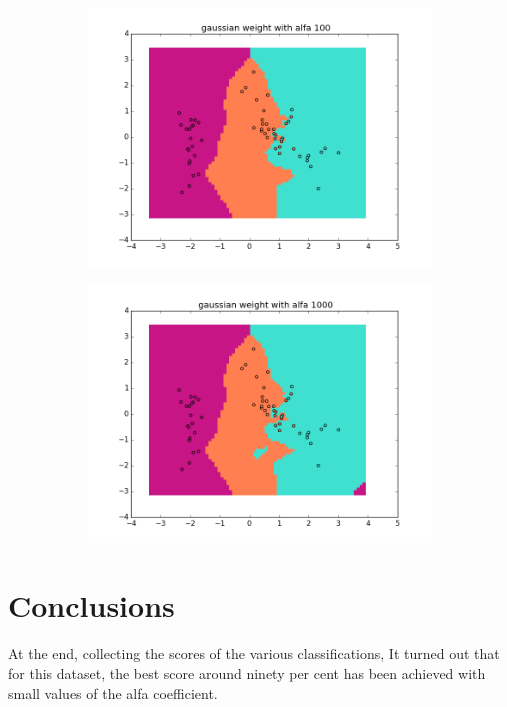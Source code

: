 \documentclass{article}
\begin{document}
\begin{center}
\begin{figure}
\centering  
        \begin{subfigure}[b]{0.48\textwidth}
                \centering
                \includegraphics[width=\linewidth]{figure_17}
        \end{subfigure}\hfill
        \begin{subfigure}[b]{0.48\textwidth}
                \centering
                \includegraphics[width=\linewidth]{figure_18}
        \end{subfigure}
        \label{fig:11}
\end{figure}
\end{center}

				
\newpage
			\part{Conclusions}
				
			At the end, collecting the scores of the various classifications, It turned out that for this dataset, the best score around ninety per cent has been achieved with small values of the alfa coefficient.  
			
		
\end{document}
